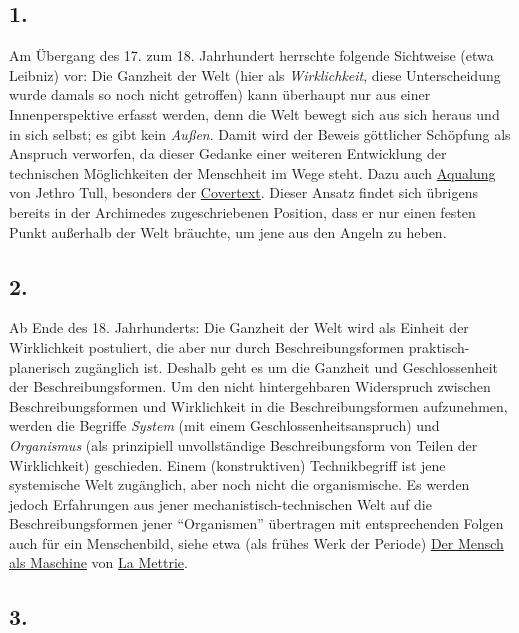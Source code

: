 \documentclass[11pt,a4paper]{article}
\begin{document}
\hypertarget{section}{%
\subsection{1.}\label{section}}

Am Übergang des 17. zum 18. Jahrhundert herrschte folgende Sichtweise
(etwa Leibniz) vor: Die Ganzheit der Welt (hier als \emph{Wirklichkeit},
diese Unterscheidung wurde damals so noch nicht getroffen) kann
überhaupt nur aus einer Innenperspektive erfasst werden, denn die Welt
bewegt sich aus sich heraus und in sich selbst; es gibt kein
\emph{Außen}. Damit wird der Beweis göttlicher Schöpfung als Anspruch
verworfen, da dieser Gedanke einer weiteren Entwicklung der technischen
Möglichkeiten der Menschheit im Wege steht. Dazu auch
\href{https://de.wikipedia.org/wiki/Aqualung_(Album)}{Aqualung} von
Jethro Tull, besonders der
\href{http://www.tullpress.com/aquatext71.htm}{Covertext}. Dieser Ansatz
findet sich übrigens bereits in der Archimedes zugeschriebenen Position,
dass er nur einen festen Punkt außerhalb der Welt bräuchte, um jene aus
den Angeln zu heben.

\hypertarget{section-1}{%
\subsection{2.}\label{section-1}}

Ab Ende des 18. Jahrhunderts: Die Ganzheit der Welt wird als Einheit der
Wirklichkeit postuliert, die aber nur durch Beschreibungsformen
praktisch-planerisch zugänglich ist. Deshalb geht es um die Ganzheit und
Geschlossenheit der Beschreibungsformen. Um den nicht hintergehbaren
Widerspruch zwischen Beschreibungsformen und Wirklichkeit in die
Beschreibungsformen aufzunehmen, werden die Begriffe \emph{System} (mit
einem Geschlossenheitsanspruch) und \emph{Organismus} (als prinzipiell
unvollständige Beschreibungsform von Teilen der Wirklichkeit)
geschieden. Einem (konstruktiven) Technikbegriff ist jene systemische
Welt zugänglich, aber noch nicht die organismische. Es werden jedoch
Erfahrungen aus jener mechanistisch-technischen Welt auf die
Beschreibungsformen jener ``Organismen'' übertragen mit entsprechenden
Folgen auch für ein Menschenbild, siehe etwa (als frühes Werk der
Periode) \href{http://www.lsr-projekt.de/lm1.html}{Der Mensch als
Maschine} von
\href{https://de.wikipedia.org/wiki/Julien_Offray_de_La_Mettrie}{La
Mettrie}.

\hypertarget{section-2}{%
\subsection{3.}\label{section-2}}
\end{document}
